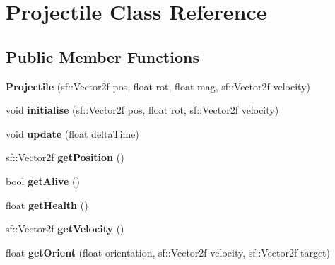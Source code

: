 \hypertarget{class_projectile}{}\section{Projectile Class Reference}
\label{class_projectile}
\subsection*{Public Member Functions}
\begin{DoxyCompactItemize}
\item 
\mbox{\label{class_projectile_aa89daaa748dc847bd0ed4c5b131e18c1}} 
{\bfseries Projectile} (sf\+::\+Vector2f pos, float rot, float mag, sf\+::\+Vector2f velocity)
\item 
\mbox{\label{class_projectile_a9b1fe47f547a234439f87adc8759df8d}} 
void {\bfseries initialise} (sf\+::\+Vector2f pos, float rot, sf\+::\+Vector2f velocity)
\item 
\mbox{\label{class_projectile_a5bc646de87829b911d6817a6478c353e}} 
void {\bfseries update} (float delta\+Time)
\item 
\mbox{\label{class_projectile_a88ed5be04ec9eddeb83deb201607368c}} 
sf\+::\+Vector2f {\bfseries get\+Position} ()
\item 
\mbox{\label{class_projectile_acdcf53a4c078135f7d7cd86871c9bb91}} 
bool {\bfseries get\+Alive} ()
\item 
\mbox{\label{class_projectile_a983d5d433a3dc8c6124e7efe2a57c635}} 
float {\bfseries get\+Health} ()
\item 
\mbox{\label{class_projectile_a92bcfb9a5b0fdcdaf73bf38502f22304}} 
sf\+::\+Vector2f {\bfseries get\+Velocity} ()
\item 
\mbox{\label{class_projectile_aebced9bbe25d8b9a3b214a12201a04d9}} 
float {\bfseries get\+Orient} (float orientation, sf\+::\+Vector2f velocity, sf\+::\+Vector2f target)
\item 
\mbox{\label{class_projectile_afb7d5c794f26e495ccbc5b597bb01246}} 

\end{DoxyCompactItemize}
